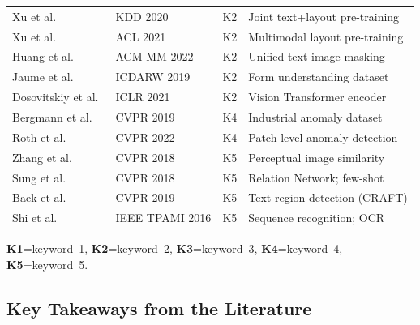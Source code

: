 \begin{longtable}{p{5.2cm}p{3.8cm}cp{2.8cm}}
Xu et al.~\cite{xu2020layoutlm}              & KDD 2020 & K2 & Joint text+layout pre-training \\
Xu et al.~\cite{xu2021layoutlmv2}            & ACL 2021 & K2 & Multimodal layout pre-training \\
Huang et al.~\cite{huang2022layoutlmv3}      & ACM MM 2022 & K2 & Unified text-image masking \\
Jaume et al.~\cite{jaume2019funsd}           & ICDARW 2019 & K2 & Form understanding dataset \\
Dosovitskiy et al.~\cite{dosovitskiy2021vit} & ICLR 2021 & K2 & Vision Transformer encoder \\
Bergmann et al.~\cite{bergmann2019mvtec}     & CVPR 2019 & K4 & Industrial anomaly dataset \\
Roth et al.~\cite{roth2022patchcore}         & CVPR 2022 & K4 & Patch-level anomaly detection \\
Zhang et al.~\cite{zhang2018lpips}           & CVPR 2018 & K5 & Perceptual image similarity \\
Sung et al.~\cite{sung2018relation}          & CVPR 2018 & K5 & Relation Network; few-shot \\
Baek et al.~\cite{baek2019craft}             & CVPR 2019 & K5 & Text region detection (CRAFT) \\
Shi et al.~\cite{shi2016crnn}               & IEEE TPAMI 2016 & K5 & Sequence recognition; OCR \\
\end{longtable}

\noindent\textbf{K1}=keyword~1, \textbf{K2}=keyword~2, \textbf{K3}=keyword~3,
\textbf{K4}=keyword~4, \textbf{K5}=keyword~5.

\subsection{Key Takeaways from the Literature}


